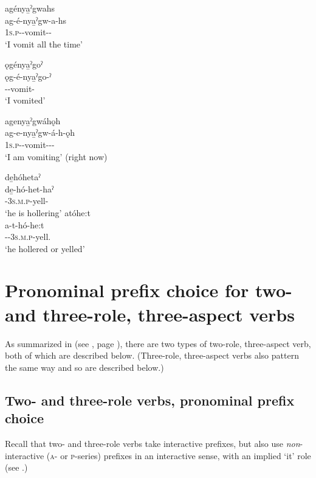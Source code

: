\ea\label{ex:3aspswitex5}
\ea agénya̱ˀgwahs\\
\gll ag-é-nya̱ˀgw-a-hs\\
 \textsc{1s.p}-{\joinerE}-vomit-{\joinerA}-{\habitual}\\
\glt `I vomit all the time'

\ex ǫgénya̱ˀgoˀ\\
\gll ǫg-é-nya̱ˀgo-ˀ\\
 -{\joinerE}-vomit-{\punctual}\\
\glt `I vomited'

\ex agenya̱ˀgwáhǫh\\
\gll ag-e-nya̱ˀgw-á-h-ǫh\\
\textsc{1s.p}-{\joinerE}-vomit-{\joinerA}-{\dislocative}-{\stative}\\
\glt ‘I am vomiting’ (right now)\\
\z
\z

\newpage

\ea\label{ex:3aspswitex6}
\ea de̱hóhetaˀ\\
\gll de̱-hó-het-haˀ\\
 {\dualic}-\textsc{3s.m.p}-yell-{\habitual}\\
\glt `he is hollering'
\ex atóhe:t\\
\gll a-t-hó-he:t\\
 {\factual}-{\dualic}-\textsc{3s.m.p}-yell.{\zeropunctual}\\
\glt `he hollered or yelled'

\z
\z


\section{Pronominal prefix choice for two- and three-role, three-aspect verbs} \label{Pronominal prefix choice for two- and three-role, three-aspect verbs}
As summarized in (see , page \pageref{figtab:1:ppthreeaspv}), there are two types of two-role, three-aspect verb, both of which are described below. (Three-role, three-aspect verbs also pattern the same way and so are described below.)

\subsection{Two- and three-role verbs, pronominal prefix choice} \label{Two- and three-role verbs, A prefixes in the habitual and punctual, O prefixes in the stative}
Recall that two- and three-role verbs take interactive prefixes, but also use \emph{non}-interactive (\textsc{a}- or \textsc{p}-series) prefixes in an interactive sense, with an implied ‘it’ role (see .) 

